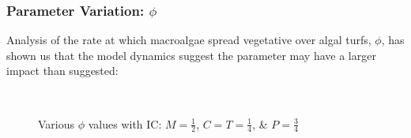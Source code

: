 \documentclass[12pt]{article}
\begin{document}
\subsubsection{Parameter Variation: $\phi$}
Analysis of the rate at which macroalgae spread vegetative over algal turfs, $\phi$, has shown us that the model dynamics  suggest the parameter may have a larger impact than suggested:\\
\begin{figure}[H]%
    \centering
    \quad
    \\
    \quad
    \caption{Various $\phi$ values with IC: $M = \frac{1}{2}$, $C = T = \frac{1}{4}$, \& $P = \frac{3}{4}$}%
    \label{fig:phi_graphs}%
\end{figure}
\end{document}
